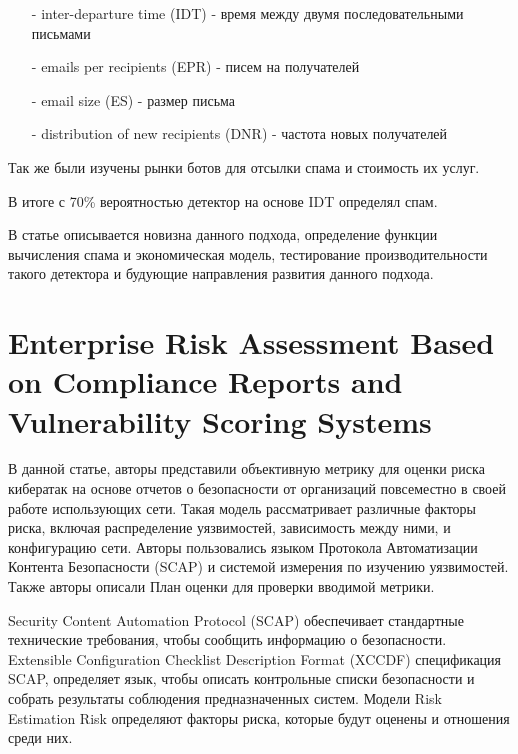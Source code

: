 \documentclass[11pt, a4paper]{article}		%
\begin{document}
\begin{itemize}

\item[-] inter-departure time (IDT) - время между двумя последовательными письмами

\item[-] emails per recipients (EPR) - писем на получателей

\item[-] email size (ES) - размер письма

\item[-] distribution of new recipients (DNR) - частота новых получателей

\end{itemize}

Так же были изучены рынки ботов для отсылки спама и стоимость их услуг. 

В итоге с 70\% вероятностью детектор на основе IDT определял спам. 

В статье описывается новизна данного подхода, определение функции вычисления спама и экономическая модель, тестирование производительности такого детектора и будующие направления развития данного подхода.



\section{Enterprise Risk Assessment Based on Compliance Reports and Vulnerability Scoring Systems}

В данной статье, авторы представили объективную метрику для оценки риска кибератак на основе отчетов о безопасности от организаций повсеместно в своей работе использующих сети. Такая модель рассматривает различные факторы риска, включая распределение уязвимостей, зависимость между
ними, и конфигурацию сети. Авторы пользовались языком Протокола Автоматизации Контента Безопасности (SCAP) и системой измерения по изучению уязвимостей. Также авторы описали План оценки для проверки вводимой метрики.

Security Content Automation Protocol (SCAP) обеспечивает стандартные технические требования, чтобы сообщить информацию о безопасности. Extensible Configuration Checklist Description Format (XCCDF) спецификация SCAP, определяет язык, чтобы описать контрольные списки безопасности и собрать результаты соблюдения предназначенных систем. Модели Risk Estimation Risk определяют факторы риска, которые будут оценены и отношения среди них.
\end{document}
